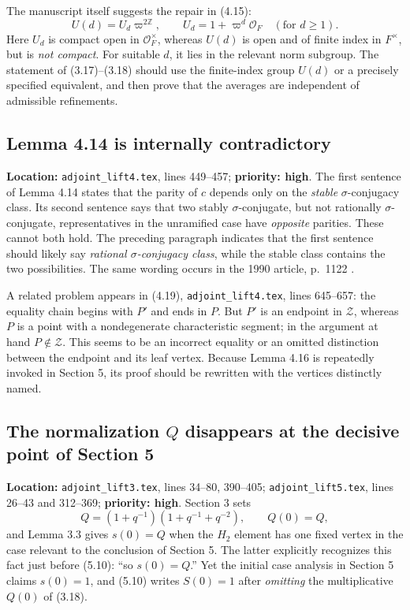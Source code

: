 \documentclass[12pt,letterpaper]{article}
\newcommand{\OF}{\mathcal O_F}
\begin{document}
The manuscript itself suggests the repair in (4.15):
\[
U(d)=U_d\varpi^{2\mathbb Z},\qquad
U_d=1+\varpi^d\OF
\quad(\text{for }d\ge1).
\]
Here $U_d$ is compact open in $\OF^\times$, whereas $U(d)$ is open
and of finite index in $F^\times$, but is \emph{not compact}.
For suitable $d$, it lies in the relevant norm subgroup. The statement
of (3.17)--(3.18) should use the finite-index group $U(d)$ or a
precisely specified equivalent, and then prove that the averages are
independent of admissible refinements.

\subsection{Lemma 4.14 is internally contradictory}
\label{issue:parity}

\textbf{Location:} \texttt{adjoint\_lift4.tex}, lines 449--457;
\textbf{priority: high}. The first sentence of Lemma 4.14 states that
the parity of $c$ depends only on the \emph{stable}
$\sigma$-conjugacy class. Its second sentence says that two
stably $\sigma$-conjugate, but not rationally $\sigma$-conjugate,
representatives in the unramified case have \emph{opposite} parities.
These cannot both hold. The preceding paragraph indicates that the first
sentence should likely say \emph{rational $\sigma$-conjugacy class},
while the stable class contains the two possibilities. The same wording
occurs in the 1990 article, p.~1122 \cite{Joyner1990}.

A related problem appears in (4.19),
\texttt{adjoint\_lift4.tex}, lines 645--657: the equality chain begins
with $P'$ and ends in $P$. But $P'$ is an endpoint in $\mathcal Z$,
whereas $P$ is a point with a nondegenerate characteristic segment;
in the argument at hand $P\notin\mathcal Z$. This seems to be an
incorrect equality or an omitted distinction between the endpoint and
its leaf vertex. Because Lemma 4.16 is repeatedly invoked in Section 5,
its proof should be rewritten with the vertices distinctly named.

\subsection{The normalization $Q$ disappears at the decisive point of
Section 5}
\label{issue:Q}

\textbf{Location:} \texttt{adjoint\_lift3.tex}, lines 34--80,
390--405; \texttt{adjoint\_lift5.tex}, lines 26--43 and 312--369;
\textbf{priority: high}. Section 3 sets
\[
Q=(1+q^{-1})(1+q^{-1}+q^{-2}),\qquad Q(0)=Q,
\]
and Lemma 3.3 gives $s(0)=Q$ when the $H_2$ element has one fixed
vertex in the case relevant to the conclusion of Section 5.
The latter explicitly recognizes this fact just before (5.10):
``so $s(0)=Q$.'' Yet the initial case analysis in Section 5 claims
$s(0)=1$, and (5.10) writes $S(0)=1$ after \emph{omitting} the
multiplicative $Q(0)$ of (3.18).
\end{document}
